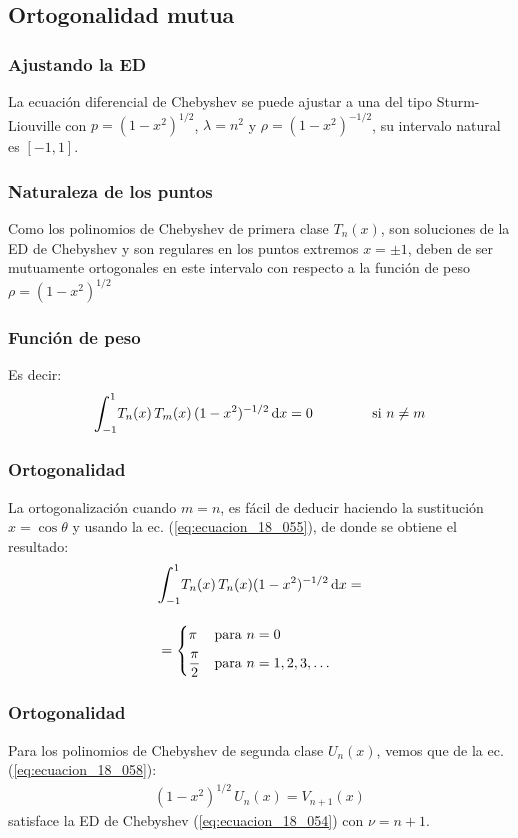 \documentclass[12pt]{beamer}
\begin{document}
\subsection{Ortogonalidad mutua}

\begin{frame}
\frametitle{Ajustando la ED}
La ecuación diferencial de Chebyshev se puede ajustar a una del tipo Sturm-Liouville con $p = (1 - x^{2})^{1/2}$, $\lambda = n^{2}$ y $\rho = (1 - x^{2})^{-1/2}$, su intervalo natural es $[-1, 1]$.
\end{frame}
\begin{frame}
\frametitle{Naturaleza de los puntos}
Como los polinomios de Chebyshev de primera clase $T_{n}(x)$, son soluciones de la ED de Chebyshev y son regulares en los puntos extremos $x = \pm 1$, \pause deben de ser mutuamente ortogonales en este intervalo con respecto a la función de peso $\rho = (1 - x^{2})^{1/2}$
\end{frame}
\begin{frame}
\frametitle{Función de peso}
Es decir:
\pause
\begin{align}
\scaleint{6ex}_{\bs -1}^{1} T_{n}(x) \, T_{m}(x) \, (1 - x^{2})^{-1/2} \dd{x} = 0 \hspace{1.5cm} \mbox{si  } n \neq m
\label{ec:ecuacion_18_061}
\end{align}
\end{frame}
\begin{frame}
\frametitle{Ortogonalidad}
La ortogonalización cuando $m = n$, es fácil de deducir haciendo la sustitución $x = \cos \theta$ y usando la ec. (\ref{eq:ecuacion_18_055}), de donde se obtiene el resultado:
\pause
\begin{align}
\begin{aligned}
&\scaleint{6ex}_{\bs -1}^{1} T_{n} (x) \, T_{n} (x) (1 - x^{2})^{-1/2} \dd{x} = \\[1em]
&= \begin{cases}
\pi & \mbox{para  } n = 0 \\[0.5em]
\dfrac{\pi}{2} & \mbox{para  } n = 1, 2, 3, \ldots
\end{cases}
\end{aligned}
\label{eq:ecuacion_18_062}
\end{align}
\end{frame}
\begin{frame}
\frametitle{Ortogonalidad}
Para los polinomios de Chebyshev de segunda clase $U_{n}(x)$, vemos que de la ec. (\ref{eq:ecuacion_18_058}):
\pause
\begin{align*}
(1 - x^{2})^{1/2} \, U_{n} (x) = V_{n+1} (x)
\end{align*}
satisface la ED de Chebyshev (\ref{eq:ecuacion_18_054}) con $\nu = n + 1$.
\end{frame}
\end{document}
